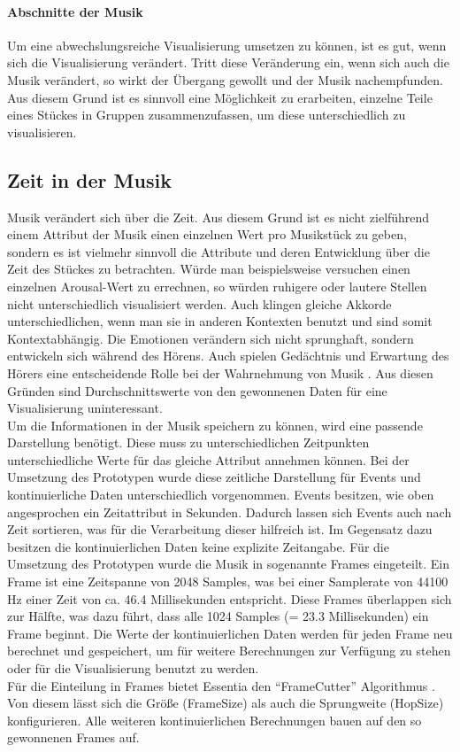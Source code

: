 \documentclass[11pt,a4paper]{article}
\begin{document}
\paragraph{Abschnitte der Musik}
Um eine abwechslungsreiche Visualisierung umsetzen zu können, ist es gut, wenn sich die Visualisierung verändert. Tritt diese Veränderung ein, wenn sich auch die Musik verändert, so wirkt der Übergang gewollt und der Musik nachempfunden. Aus diesem Grund ist es sinnvoll eine Möglichkeit zu erarbeiten, einzelne Teile eines Stückes in Gruppen zusammenzufassen, um diese unterschiedlich zu visualisieren.

\subsection{Zeit in der Musik}
Musik verändert sich über die Zeit. Aus diesem Grund ist es nicht zielführend einem Attribut der Musik einen einzelnen Wert pro Musikstück zu geben, sondern es ist vielmehr sinnvoll die Attribute und deren Entwicklung über die Zeit des Stückes zu betrachten. Würde man beispielsweise versuchen einen einzelnen Arousal-Wert zu errechnen, so würden ruhigere oder lautere Stellen nicht unterschiedlich visualisiert werden. Auch klingen gleiche Akkorde unterschiedlichen, wenn man sie in anderen Kontexten benutzt und sind somit Kontextabhängig. Die Emotionen verändern sich nicht sprunghaft, sondern entwickeln sich während des Hörens. Auch spielen Gedächtnis und Erwartung des Hörers eine entscheidende Rolle bei der Wahrnehmung von Musik \cite[S. 2]{8a02f9c512933d46fbea928d23ac65e38b61b88caba9b38319a5d4952b5a6667}. Aus diesen Gründen sind Durchschnittswerte von den gewonnenen Daten für eine Visualisierung uninteressant.\\
Um die Informationen in der Musik speichern zu können, wird eine passende Darstellung benötigt. Diese muss zu unterschiedlichen Zeitpunkten unterschiedliche Werte für das gleiche Attribut annehmen können. Bei der Umsetzung des Prototypen wurde diese zeitliche Darstellung für Events und kontinuierliche Daten unterschiedlich vorgenommen. Events besitzen, wie oben angesprochen ein Zeitattribut in Sekunden. Dadurch lassen sich Events auch nach Zeit sortieren, was für die Verarbeitung dieser hilfreich ist. Im Gegensatz dazu besitzen die kontinuierlichen Daten keine explizite Zeitangabe. Für die Umsetzung des Prototypen wurde die Musik in sogenannte Frames eingeteilt. Ein Frame ist eine Zeitspanne von 2048 Samples, was bei einer Samplerate von 44100 Hz einer Zeit von ca. 46.4 Millisekunden entspricht. Diese Frames überlappen sich zur Hälfte, was dazu führt, dass alle 1024 Samples (= 23.3 Millisekunden) ein Frame beginnt. Die Werte der kontinuierlichen Daten werden für jeden Frame neu berechnet und gespeichert, um für weitere Berechnungen zur Verfügung zu stehen oder für die Visualisierung benutzt zu werden.\\
Für die Einteilung in Frames bietet Essentia den ``FrameCutter'' Algorithmus \cite{EssentiaFrameCutter}. Von diesem lässt sich die Größe (FrameSize) als auch die Sprungweite (HopSize) konfigurieren. Alle weiteren kontinuierlichen Berechnungen bauen auf den so gewonnenen Frames auf.
\end{document}
